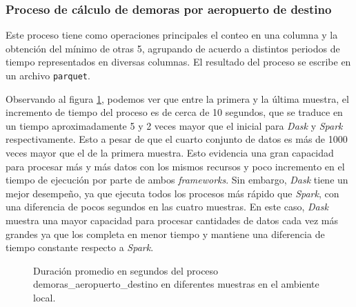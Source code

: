 \subsubsection{Proceso de cálculo de demoras por aeropuerto de destino}

Este proceso tiene como operaciones principales el conteo en una columna y la obtención del mínimo de otras 5, agrupando de acuerdo a distintos periodos de tiempo representados en diversas columnas. El resultado del proceso se escribe en un archivo \texttt{parquet}.

Observando al figura \ref{lineas:local-demoras-aeropuerto-destino}, podemos ver que entre la primera y la última muestra, el incremento de tiempo del proceso es de cerca de 10 segundos, que se traduce en un tiempo aproximadamente 5 y 2 veces mayor que el inicial para \textit{Dask} y \textit{Spark} respectivamente. Esto a pesar de que el cuarto conjunto de datos es más de 1000 veces mayor que el de la primera muestra. Esto evidencia una gran capacidad para procesar más y más datos con los mismos recursos y poco incremento en el tiempo de ejecución por parte de ambos \textit{frameworks}. Sin embargo, \textit{Dask} tiene un mejor desempeño, ya que ejecuta todos los procesos más rápido que \textit{Spark}, con una diferencia de pocos segundos en las cuatro muestras. En este caso, \textit{Dask} muestra una mayor capacidad para procesar cantidades de datos cada vez más grandes ya que los completa en menor tiempo y mantiene una diferencia de tiempo constante respecto a \textit{Spark}.

\begin{figure}
\centering
{}
\caption{Duración promedio en segundos del proceso demoras\_aeropuerto\_destino en diferentes muestras en el ambiente local.}
\label{lineas:local-demoras-aeropuerto-destino}
\end{figure}

